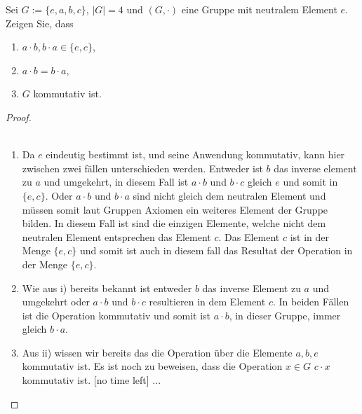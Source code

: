 \documentclass{../problemset}
\begin{document}
\pagebreak

\begin{problem}
Sei $G := \{e, a, b, c\}$, $|G| = 4$ und $(G, \cdot)$ eine Gruppe mit neutralem Element $e$. Zeigen Sie, dass
\begin{enumerate}
	\item $a \cdot b, b \cdot a \in \{e, c\}$,
	\item $a \cdot b = b \cdot a$,
	\item $G$ kommutativ ist.
\end{enumerate}

\begin{proof}
	\\\
	\begin{enumerate}
		\item Da $e$ eindeutig bestimmt ist, und seine Anwendung kommutativ, kann hier zwischen zwei fällen unterschieden werden.
		      Entweder ist $b$ das inverse element zu $a$ und umgekehrt, in diesem Fall ist $a \cdot b$ und $b \cdot c$ gleich $e$ und somit in $\{e,c\}$.
		      Oder $a \cdot b$ und $b \cdot a$ sind nicht gleich dem neutralen Element und müssen somit laut Gruppen Axiomen ein weiteres Element der Gruppe bilden.
		      In diesem Fall ist sind die einzigen Elemente, welche nicht dem neutralen Element entsprechen das Element $c$.
		      Das Element $c$ ist in der Menge $\{e, c\}$ und somit ist auch in diesem fall das Resultat der Operation in der Menge $\{e,c\}$.
		      \checkmark
		\item Wie aus i) bereits bekannt ist entweder $b$ das inverse Element zu $a$ und umgekehrt oder $a \cdot b$ und $b \cdot c$ resultieren in dem Element $c$.
		      In beiden Fällen ist die Operation kommutativ und somit ist $a \cdot b$, in dieser Gruppe, immer gleich $b \cdot a$.
		      \checkmark
		\item
		      Aus ii) wissen wir bereits das die Operation über die Elemente $a,b,e$ kommutativ ist.
		      Es ist noch zu beweisen, dass die Operation $x \in G$ $c \cdot x$ kommutativ ist.
			      [no time left] ...
	\end{enumerate}
\end{proof}
\end{problem}

\pagebreak
\end{document}
